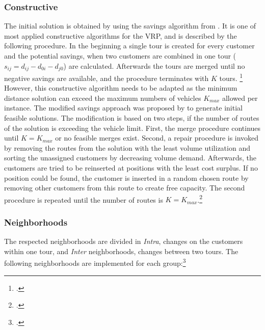 \subsubsection{Constructive}
The initial solution is obtained by using the savings algorithm from \cite{clarke_scheduling_1964}. It is one of
most applied constructive algorithms for the \gls{VRP}, and is described by the following procedure. In the beginning
a single tour is created for every customer and the potential savings, when two customers are combined in one tour
($s_{ij} = d_{ij} - d_{0i} - d_{j0}$) are calculated.
Afterwards the tours are merged until no negative savings are available, and the
procedure terminates with $K$ tours. \footcite[cf.][]{clarke_scheduling_1964} However, this constructive algorithm needs to be adapted
as the minimum distance solution can exceed the maximum numbers of vehicles $K_{max}$ allowed per instance.
The modified savings approach was proposed by \cite{zhang_evolutionary_2015} to generate initial feasible solutions.
The modification is based on two steps, if the number of routes of the solution is exceeding the vehicle limit. First,
the merge procedure continues until $K = K_{max}$ or no feasible merges exist. Second, a repair procedure is invoked
by removing the routes from the solution with the least volume utilization and sorting the unassigned customers by
decreasing volume demand. Afterwards, the customers are tried to be reinserted at positions with the least
cost surplus. If no position could be found, the customer is inserted in a random chosen route by removing
other customers from this route to create free capacity. The second procedure is repeated until the
number of routes is $K = K_{max}$.\footcite[cf.][p. 24]{zhang_evolutionary_2015}

\subsubsection{Neighborhoods}
\label{sec:neighborhoods}

The respected neighborhoods are divided in \textit{Intra}, changes on the customers within one tour, and \textit{Inter} neighborhoods,
changes between two tours. The following neighborhoods are implemented for each group:\footcite[cf.][p. 89f]{toth_vehicle_2014}

